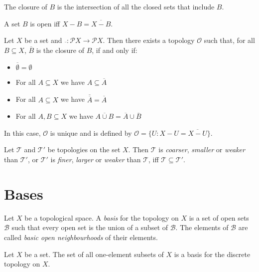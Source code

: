 \begin{prop}
The closure of $B$ is the intersection of all the closed sets that include $B$.
\end{prop}

\begin{prop}
A set $B$ is open iff $X - B = \overline{X - B}$.
\end{prop}

\begin{prop}
Let $X$ be a set and $\overline{\ } : \mathcal{P} X \rightarrow \mathcal{P} X$. Then there exists a topology $\mathcal{O}$ such that, for all $B \subseteq X$, $\overline{B}$ is the closure of $B$, if and only if:
\begin{itemize}
\item $\overline{\emptyset} = \emptyset$
\item For all $A \subseteq X$ we have $A \subseteq \overline{A}$
\item For all $A \subseteq X$ we have $\overline{\overline{A}} = \overline{A}$
\item For all $A, B \subseteq X$ we have $\overline{A \cup B} = \overline{A} \cup \overline{B}$
\end{itemize}
In this case, $\mathcal{O}$ is unique and is defined by $\mathcal{O} = \{ U : X - U = \overline{X - U} \}$.
\end{prop}

\begin{df}
Let $\mathcal{T}$ and $\mathcal{T}'$ be topologies on the set $X$. Then $\mathcal{T}$ is \emph{coarser}, \emph{smaller} or \emph{weaker} than $\mathcal{T}'$, or $\mathcal{T}'$ is \emph{finer}, \emph{larger} or \emph{weaker} than $\mathcal{T}$, iff $\mathcal{T} \subseteq \mathcal{T}'$.
\end{df}

\section{Bases}

\begin{df}[Basis]
Let $X$ be a topological space. A \emph{basis} for the topology on $X$ is a set of open sets $\mathcal{B}$ such that every open set is the union of a subset of $\mathcal{B}$. The elements of $\mathcal{B}$ are called \emph{basic open neighbourhoods} of their elements.
\end{df}

\begin{prop}
Let $X$ be a set. The set of all one-element subsets of $X$ is a basis for the discrete topology on $X$.
\end{prop}

